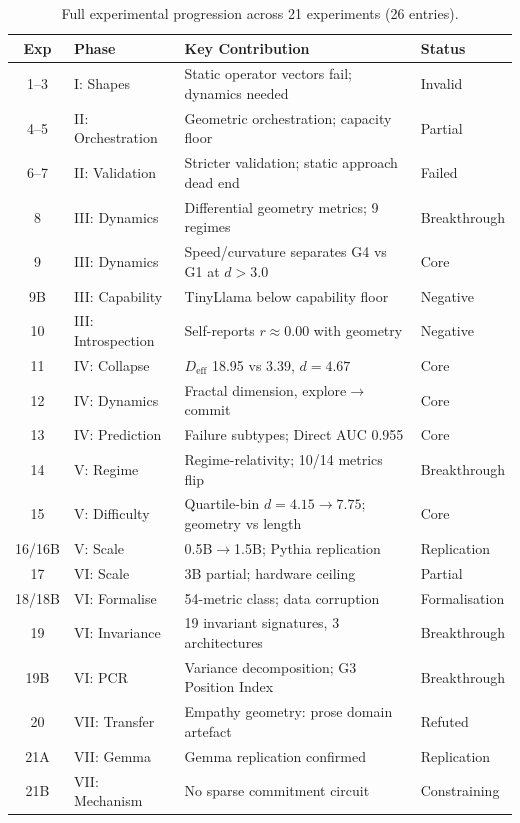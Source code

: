 \documentclass[11pt,twocolumn]{article}
\newcommand{\Deff}{D_{\text{eff}}}
\begin{document}
\begin{table}[h]
\centering
\small
\begin{tabular}{clp{7cm}l}
\toprule
\textbf{Exp} & \textbf{Phase} & \textbf{Key Contribution} & \textbf{Status} \\
\midrule
1--3 & I: Shapes & Static operator vectors fail; dynamics needed & Invalid \\
4--5 & II: Orchestration & Geometric orchestration; capacity floor & Partial \\
6--7 & II: Validation & Stricter validation; static approach dead end & Failed \\
8 & III: Dynamics & Differential geometry metrics; 9 regimes & Breakthrough \\
9 & III: Dynamics & Speed/curvature separates G4 vs G1 at $d > 3.0$ & Core \\
9B & III: Capability & TinyLlama below capability floor & Negative \\
10 & III: Introspection & Self-reports $r \approx 0.00$ with geometry & Negative \\
11 & IV: Collapse & $\Deff$ 18.95 vs 3.39, $d = 4.67$ & Core \\
12 & IV: Dynamics & Fractal dimension, explore$\to$commit & Core \\
13 & IV: Prediction & Failure subtypes; Direct AUC 0.955 & Core \\
14 & V: Regime & Regime-relativity; 10/14 metrics flip & Breakthrough \\
15 & V: Difficulty & Quartile-bin $d = 4.15 \to 7.75$; geometry vs length & Core \\
16/16B & V: Scale & 0.5B$\to$1.5B; Pythia replication & Replication \\
17 & VI: Scale & 3B partial; hardware ceiling & Partial \\
18/18B & VI: Formalise & 54-metric class; data corruption & Formalisation \\
19 & VI: Invariance & 19 invariant signatures, 3 architectures & Breakthrough \\
19B & VI: PCR & Variance decomposition; G3 Position Index & Breakthrough \\
20 & VII: Transfer & Empathy geometry: prose domain artefact & Refuted \\
21A & VII: Gemma & Gemma replication confirmed & Replication \\
21B & VII: Mechanism & No sparse commitment circuit & Constraining \\
\bottomrule
\end{tabular}
\caption{Full experimental progression across 21 experiments (26 entries).}
\label{tab:experiments}
\end{table}
\end{document}
